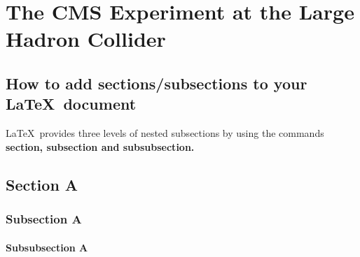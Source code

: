 

\chapter{The CMS Experiment at the Large Hadron Collider}  

\section{How to add sections/subsections to your \LaTeX\ document}


\noindent \LaTeX\ provides three levels of nested subsections by using the commands \textbf{section, subsection and subsubsection.} %

\section{Section A}
\noindent \lipsum[1][1] %

\subsection{Subsection A}
\noindent \lipsum[1][1] %

\subsubsection{Subsubsection A}
\noindent \lipsum[1][1] %


